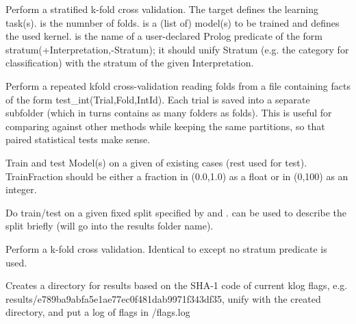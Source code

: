 \begin{description}
Perform a stratified k-fold cross validation. The target 
defines the learning task(s).  is the numnber of folds.  is a
(list of) model(s) to be trained and  defines the
used kernel.  is the name of a user-declared Prolog
predicate of the form stratum(+Interpretation,-Stratum); it should
unify Stratum (e.g. the category for classification) with the
stratum of the given Interpretation.

Perform a repeated kfold cross-validation reading folds from a file
containing facts of the form test_int(Trial,Fold,IntId). Each trial
is saved into a separate subfolder (which in turns contains as many
folders as folds). This is useful for comparing against other
methods while keeping the same partitions, so that paired
statistical tests make sense.

Train and test Model(s) on a given  of existing cases
(rest used for test). TrainFraction should be either a fraction in
(0.0,1.0) as a float or in (0,100) as an integer.

Do train/test on a given fixed split specified by  and
.  can be used to describe the split briefly (will go
into the results folder name).

Perform a k-fold cross validation. Identical to  except no stratum predicate is used.

Creates a directory for results based on the SHA-1 code of current
klog flags, e.g. results/e789ba9abfa5e1ae77ec0f481dab9971f343df35,
unify  with the created directory, and put a log of flags in
/flags.log
\end{description}

